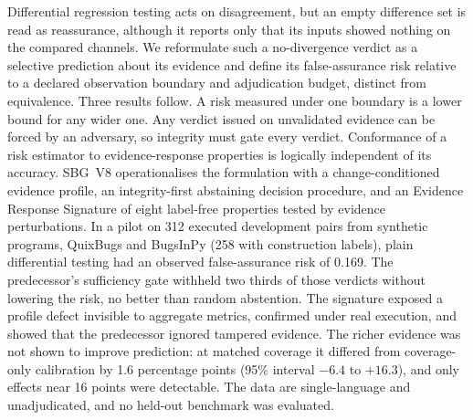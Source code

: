 Differential regression testing acts on disagreement, but an empty difference set is read as reassurance, although it reports only that its inputs showed nothing on the compared channels. We reformulate such a no-divergence verdict as a selective prediction about its evidence and define its false-assurance risk relative to a declared observation boundary and adjudication budget, distinct from equivalence. Three results follow. A risk measured under one boundary is a lower bound for any wider one. Any verdict issued on unvalidated evidence can be forced by an adversary, so integrity must gate every verdict. Conformance of a risk estimator to evidence-response properties is logically independent of its accuracy. SBG~V8 operationalises the formulation with a change-conditioned evidence profile, an integrity-first abstaining decision procedure, and an Evidence Response Signature of eight label-free properties tested by evidence perturbations. In a pilot on 312 executed development pairs from synthetic programs, QuixBugs and BugsInPy (258 with construction labels), plain differential testing had an observed false-assurance risk of 0.169. The predecessor's sufficiency gate withheld two thirds of those verdicts without lowering the risk, no better than random abstention. The signature exposed a profile defect invisible to aggregate metrics, confirmed under real execution, and showed that the predecessor ignored tampered evidence. The richer evidence was not shown to improve prediction: at matched coverage it differed from coverage-only calibration by 1.6 percentage points (95\% interval $-6.4$ to $+16.3$), and only effects near 16 points were detectable. The data are single-language and unadjudicated, and no held-out benchmark was evaluated.
